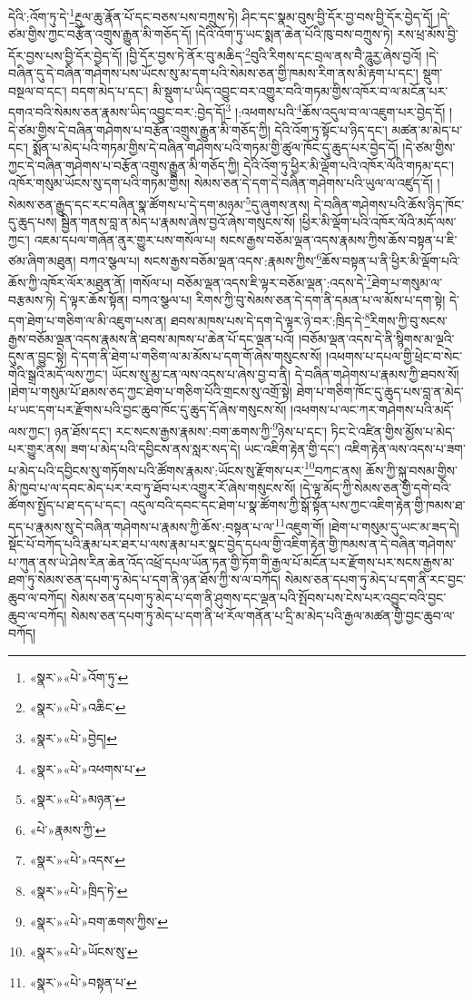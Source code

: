 དེའི་:འོག་ཏུ་དེ་\footnote{«སྣར་»«པེ་»འོག་ཏུ་}རྔུལ་ཆུ་རྣོན་པོ་དང་བཅས་པས་བཀྲུས་ཏེ། ཤིང་དང་སྣམ་བུས་བྱི་དོར་བྱ་བས་བྱི་དོར་བྱེད་དོ། །དེ་ཙམ་གྱིས་ཀྱང་བརྩོན་འགྲུས་རྒྱུན་མི་གཅོད་དོ། །དེའི་འོག་ཏུ་ཡང་སྨན་ཆེན་པོའི་ཁུ་བས་བཀྲུས་ཏེ། རས་ཕྲ་མོས་བྱི་དོར་བྱས་པས་བྱི་དོར་བྱེད་དོ། །བྱི་དོར་བྱས་ཏེ་ནོར་བུ་མཆིད་\footnote{«སྣར་»«པེ་»འཆིང་}བུའི་རིགས་དང་བྲལ་ནས་བཻ་ཌཱུརྱ་ཞེས་བྱའོ། །དེ་བཞིན་དུ་དེ་བཞིན་གཤེགས་པས་ཡོངས་སུ་མ་དག་པའི་སེམས་ཅན་གྱི་ཁམས་རིག་ནས་མི་རྟག་པ་དང་། སྡུག་བསྔལ་བ་དང་། བདག་མེད་པ་དང་། མི་སྡུག་པ་ཡིད་འབྱུང་བར་འགྱུར་བའི་གཏམ་གྱིས་འཁོར་བ་ལ་མངོན་པར་དགའ་བའི་སེམས་ཅན་རྣམས་ཡིད་འབྱུང་བར་:བྱེད་དོ།\footnote{«སྣར་»«པེ་»བྱེད།} །:འཕགས་པའི་\footnote{«སྣར་»«པེ་»འཕགས་པ་}ཆོས་འདུལ་བ་ལ་འཇུག་པར་བྱེད་དོ། །
དེ་ཙམ་གྱིས་དེ་བཞིན་གཤེགས་པ་བརྩོན་འགྲུས་རྒྱུན་མི་གཅོད་ཀྱི། དེའི་འོག་ཏུ་སྟོང་པ་ཉིད་དང་། མཚན་མ་མེད་པ་དང་། སྨོན་པ་མེད་པའི་གཏམ་གྱིས་དེ་བཞིན་གཤེགས་པའི་གཏམ་གྱི་ཚུལ་ཁོང་དུ་ཆུད་པར་བྱེད་དོ། །དེ་ཙམ་གྱིས་ཀྱང་དེ་བཞིན་གཤེགས་པ་བརྩོན་འགྲུས་རྒྱུན་མི་གཅོད་ཀྱི། དེའི་འོག་ཏུ་ཕྱིར་མི་ལྡོག་པའི་འཁོར་ལོའི་གཏམ་དང་། འཁོར་གསུམ་ཡོངས་སུ་དག་པའི་གཏམ་གྱིས། སེམས་ཅན་དེ་དག་དེ་བཞིན་གཤེགས་པའི་ཡུལ་ལ་འཛུད་དོ། །སེམས་ཅན་རྒྱུད་དང་རང་བཞིན་སྣ་ཚོགས་པ་དེ་དག་མཉམ་\footnote{«སྣར་»«པེ་»མཉན་}དུ་ཞུགས་ནས། དེ་བཞིན་གཤེགས་པའི་ཆོས་ཉིད་ཁོང་དུ་ཆུད་པས། སྦྱིན་གནས་བླ་ན་མེད་པ་རྣམས་ཞེས་བྱའོ་ཞེས་གསུངས་སོ། །ཕྱིར་མི་ལྡོག་པའི་འཁོར་ལོའི་མདོ་ལས་ཀྱང་། འཇམ་དཔལ་གཞོན་ནུར་གྱུར་པས་གསོལ་པ། སངས་རྒྱས་བཅོམ་ལྡན་འདས་རྣམས་ཀྱིས་ཆོས་བསྟན་པ་ཇི་ཙམ་ཞིག་མཐུན། བཀའ་སྩལ་པ། སངས་རྒྱས་བཅོམ་ལྡན་འདས་:རྣམས་ཀྱིས་\footnote{«པེ་»རྣམས་ཀྱི་}ཆོས་བསྟན་པ་ནི་ཕྱིར་མི་ལྡོག་པའི་ཆོས་ཀྱི་འཁོར་ལོར་མཐུན་ནོ། །གསོལ་པ། བཅོམ་ལྡན་འདས་ཇི་ལྟར་བཅོམ་ལྡན་:འདས་དེ་\footnote{«སྣར་»«པེ་»འདས་}ཐེག་པ་གསུམ་ལ་བརྩམས་ཏེ། དེ་ལྟར་ཆོས་སྟོན། བཀའ་སྩལ་པ། རིགས་ཀྱི་བུ་སེམས་ཅན་དེ་དག་ནི་དམན་པ་ལ་མོས་པ་དག་སྟེ། དེ་དག་ཐེག་པ་གཅིག་ལ་མི་འཇུག་པས་ན། ཐབས་མཁས་པས་དེ་དག་དེ་ལྟར་ཉེ་བར་:ཁྲིད་དེ་\footnote{«སྣར་»«པེ་»ཁྲིད་ཏེ་}རིགས་ཀྱི་བུ་སངས་རྒྱས་བཅོམ་ལྡན་འདས་རྣམས་ནི་ཐབས་མཁས་པ་ཆེན་པོ་དང་ལྡན་པའོ། །བཅོམ་ལྡན་འདས་དེ་ནི་སྙིགས་མ་ལྔའི་དུས་ན་བྱུང་སྟེ། དེ་དག་ནི་ཐེག་པ་གཅིག་ལ་མ་མོས་པ་དག་གོ་ཞེས་གསུངས་སོ། །འཕགས་པ་དཔལ་གྱི་ཕྲེང་བ་སེང་གེའི་སྒྲའི་མདོ་ལས་ཀྱང་། ཡོངས་སུ་མྱ་ངན་ལས་འདས་པ་ཞེས་བྱ་བ་ནི། དེ་བཞིན་གཤེགས་པ་རྣམས་ཀྱི་ཐབས་སོ། །ཐེག་པ་གསུམ་པོ་ཐམས་ཅད་ཀྱང་ཐེག་པ་གཅིག་པོའི་གྲངས་སུ་འགྲོ་སྟེ། ཐེག་པ་གཅིག་ཁོང་དུ་ཆུད་པས་བླ་ན་མེད་པ་ཡང་དག་པར་རྫོགས་པའི་བྱང་ཆུབ་ཁོང་དུ་ཆུད་དོ་ཞེས་གསུངས་སོ། །འཕགས་པ་ལང་ཀར་གཤེགས་པའི་མདོ་ལས་ཀྱང་། ཉན་ཐོས་དང་། རང་སངས་རྒྱས་རྣམས་:བག་ཆགས་ཀྱི་\footnote{«སྣར་»«པེ་»བག་ཆགས་ཀྱིས་}ཉེས་པ་དང་། ཏིང་ངེ་འཛིན་གྱིས་མྱོས་པ་མེད་པར་གྱུར་ནས། ཟག་པ་མེད་པའི་དབྱིངས་ནས་སླར་སད་དེ། ཡང་འཇིག་རྟེན་གྱི་དང་། འཇིག་རྟེན་ལས་འདས་པ་ཟག་པ་མེད་པའི་དབྱིངས་སུ་གཏོགས་པའི་ཚོགས་རྣམས་:ཡོངས་སུ་རྫོགས་པར་\footnote{«སྣར་»«པེ་»ཡོངས་སུ་}བཀང་ནས། ཆོས་ཀྱི་སྐུ་བསམ་གྱིས་མི་ཁྱབ་པ་ལ་དབང་མེད་པར་རབ་ཏུ་ཐོབ་པར་འགྱུར་རོ་ཞེས་གསུངས་སོ། །དེ་ལྟ་མོད་ཀྱི་སེམས་ཅན་གྱི་དགེ་བའི་ཚོགས་སྤྱོད་པ་ཐ་དད་པ་དང་། འདུལ་བའི་དབང་དང་ཐེག་པ་སྣ་ཚོགས་ཀྱི་སྒོ་སྟོན་པས་ཀྱང་འཇིག་རྟེན་གྱི་ཁམས་ཐ་དད་པ་རྣམས་སུ་དེ་བཞིན་གཤེགས་པ་རྣམས་ཀྱི་ཆོས་:བསྟན་པ་ལ་\footnote{«སྣར་»«པེ་»བསྟན་པ་}འཇུག་གོ། །ཐེག་པ་གསུམ་དུ་ཡང་མ་ཟད་དེ། སྡོང་པོ་བཀོད་པའི་རྣམ་པར་ཐར་པ་ལས་རྣམ་པར་སྣང་བྱེད་དཔལ་གྱི་འཇིག་རྟེན་གྱི་ཁམས་ན་དེ་བཞིན་གཤེགས་པ་ཀུན་ནས་ཡེ་ཤེས་རིན་ཆེན་འོད་འཕྲོ་དཔལ་ཡོན་ཏན་གྱི་ཏོག་གི་རྒྱལ་པོ་མངོན་པར་རྫོགས་པར་སངས་རྒྱས་མ་ཐག་ཏུ་སེམས་ཅན་དཔག་ཏུ་མེད་པ་དག་ནི་ཉན་ཐོས་ཀྱི་ས་ལ་བཀོད། སེམས་ཅན་དཔག་ཏུ་མེད་པ་དག་ནི་རང་བྱང་ཆུབ་ལ་བཀོད། སེམས་ཅན་དཔག་ཏུ་མེད་པ་དག་ནི་ཤུགས་དང་ལྡན་པའི་སྤོབས་པས་ངེས་པར་འབྱུང་བའི་བྱང་ཆུབ་ལ་བཀོད། སེམས་ཅན་དཔག་ཏུ་མེད་པ་དག་ནི་ཕ་རོལ་གནོན་པ་དྲི་མ་མེད་པའི་རྒྱལ་མཚན་གྱི་བྱང་ཆུབ་ལ་བཀོད། 